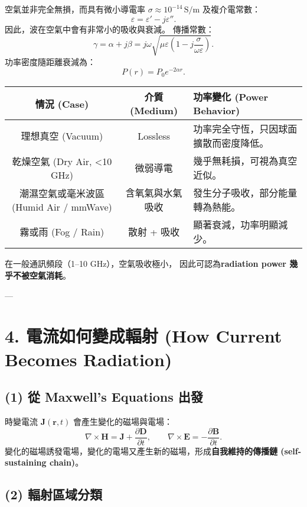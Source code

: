 \documentclass[12pt,a4paper]{article}
\begin{document}
空氣並非完全無損，而具有微小導電率 \(\sigma \approx 10^{-14}\,\mathrm{S/m}\) 及複介電常數：
\[
\varepsilon = \varepsilon' - j\varepsilon''.
\]
因此，波在空氣中會有非常小的吸收與衰減。  
傳播常數：
\[
\gamma = \alpha + j\beta = j\omega\sqrt{\mu\varepsilon\left(1 - j\frac{\sigma}{\omega\varepsilon}\right)}.
\]
功率密度隨距離衰減為：
\[
P(r) = P_0 e^{-2\alpha r}.
\]

\begin{center}
\renewcommand{\arraystretch}{1.3}
\setlength{\tabcolsep}{6pt}
\begin{tabularx}{\textwidth}{|c|c|X|}
\hline
\textbf{情況 (Case)} & \textbf{介質 (Medium)} & \textbf{功率變化 (Power Behavior)} \\
\hline
理想真空 (Vacuum) & Lossless & 功率完全守恆，只因球面擴散而密度降低。 \\
\hline
乾燥空氣 (Dry Air, <10 GHz) & 微弱導電 & 幾乎無耗損，可視為真空近似。 \\
\hline
潮濕空氣或毫米波區 (Humid Air / mmWave) & 含氧氣與水氣吸收 & 發生分子吸收，部分能量轉為熱能。 \\
\hline
霧或雨 (Fog / Rain) & 散射 + 吸收 & 顯著衰減，功率明顯減少。 \\
\hline
\end{tabularx}
\end{center}

在一般通訊頻段（1–10 GHz），空氣吸收極小，
因此可認為\textbf{radiation power 幾乎不被空氣消耗}。

---

\section*{4. 電流如何變成輻射 (How Current Becomes Radiation)}

\subsection*{(1) 從 Maxwell’s Equations 出發}

時變電流 \( \mathbf{J}(\mathbf{r},t) \) 會產生變化的磁場與電場：
\[
\nabla \times \mathbf{H} = \mathbf{J} + \frac{\partial \mathbf{D}}{\partial t}, 
\qquad
\nabla \times \mathbf{E} = -\frac{\partial \mathbf{B}}{\partial t}.
\]
變化的磁場誘發電場，變化的電場又產生新的磁場，形成\textbf{自我維持的傳播鏈 (self-sustaining chain)}。

\subsection*{(2) 輻射區域分類}
\end{document}
